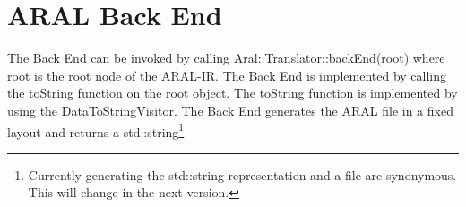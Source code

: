 \section{ARAL Back End}

The Back End can be invoked by calling Aral::Translator::backEnd(root)
where root is the root node of the ARAL-IR. The Back End is
implemented by calling the toString function on the root object. The
toString function is implemented by using the DataToStringVisitor.
The Back End generates the ARAL file in a fixed layout and returns a
std::string\footnote{Currently generating the std::string representation and a file
are synonymous. This will change in the next version.}
